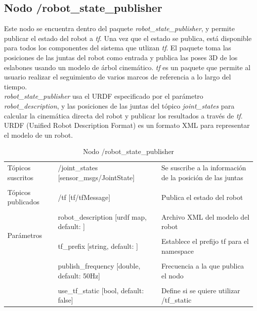 \documentclass[12pt,twoside,final]{book}
\begin{document}
\subsection{Nodo /robot\_state\_publisher}
Este nodo se encuentra dentro del paquete \textit{robot\_state\_publisher}, y permite publicar el estado del robot a \textit{tf}. Una vez que el estado se publica, está disponible para todos los componentes del sistema que utlizan \textit{tf}. El paquete toma las posiciones de las juntas del robot como entrada y publica las poses 3D de los eslabones usando un modelo de árbol cinemático. \textit{tf} es un paquete que permite al usuario realizar el seguimiento de varios marcos de referencia a lo largo del tiempo.\\

\textit{robot\_state\_publisher} usa el URDF especificado por el parámetro \textit{robot\_description}, y las posiciones de las juntas del tópico \textit{joint\_states} para calcular la cinemática directa del robot y publicar los resultados a través de \textit{tf}. URDF (Unified Robot Description Format) es un formato  XML para representar el modelo de un robot.

\begin{table}[H]
\begin{center}
\begin{tabular}{|l|l|p{4cm}|}%
\hline

Tópicos suscritos &  /joint\_states [sensor\_msgs/JointState] & Se suscribe a la información de la posición de las juntas \\ 
& & \\
\hline

Tópicos publicados &  /tf [tf/tfMessage] & Publica el estado del robot \\
& & \\
\hline

\multirow{4}{*}{Parámetros} 
&  robot\_description [urdf map, default: ] & Archivo XML del modelo del robot \\
& & \\
& tf\_prefix [string, default: ]  & Establece el prefijo tf para el namespace\\
& & \\
& publish\_frequency [double, default: 50Hz] & Frecuencia a la que publica el nodo\\
& & \\
& use\_tf\_static [bool, default: false]  & Define si se quiere utilizar /tf\_static\\
\cline{1-3}

\end{tabular}
\caption{Nodo /robot\_state\_publisher}
\label{robot state publisher node}
\end{center}
\end{table}
\end{document}
